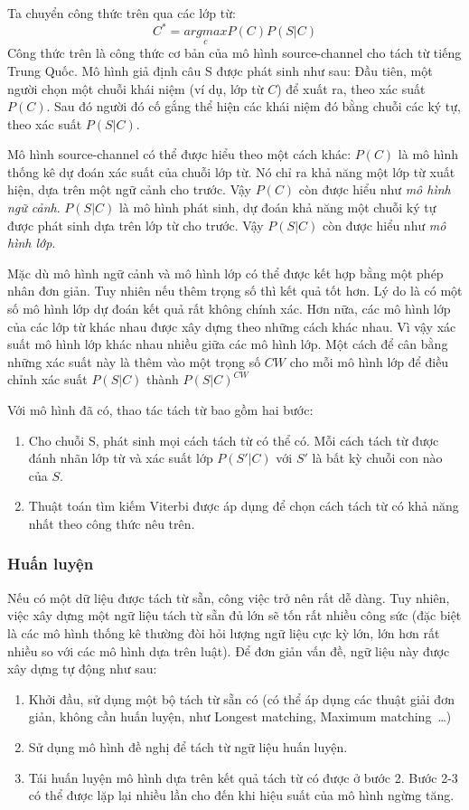\documentclass[a4paper,oneside,14pt]{extbook} %
\begin{document}
Ta chuyển công thức trên qua các lớp từ:
$$C^*=\underset{c}{argmax}P(C)P(S|C)$$
Công thức trên là công thức cơ bản của mô hình source-channel cho tách
từ tiếng Trung Quốc. Mô hình giả định câu S được phát sinh như sau:
Đầu tiên, một người chọn một chuỗi khái niệm (ví dụ, lớp từ $C$) để
xuất ra, theo xác suất $P(C)$. Sau đó người đó cố gắng thể hiện các
khái niệm đó bằng chuỗi các ký tự, theo xác suất $P(S|C)$.

Mô hình source-channel có thể được hiểu theo một cách khác: $P(C)$ là
mô hình thống kê dự đoán xác suất của chuỗi lớp từ. Nó chỉ ra khả năng
một lớp từ xuất hiện, dựa trên một ngữ cảnh cho trước. Vậy $P(C)$ còn
được hiểu như {\em mô hình ngữ cảnh}. $P(S|C)$ là mô hình phát sinh,
dự đoán khả năng một chuỗi ký tự được phát sinh dựa trên lớp từ cho
trước. Vậy $P(S|C)$ còn được hiểu như {\em mô hình lớp}.

Mặc dù mô hình ngữ cảnh và mô hình lớp có thể được kết hợp bằng một
phép nhân đơn giản. Tuy nhiên nếu thêm trọng số thì kết quả tốt
hơn. Lý do là có một số mô hình lớp dự đoán kết quả rất không chính
xác. Hơn nữa, các mô hình lớp của các lớp từ khác nhau được xây dựng
theo những cách khác nhau. Vì vậy xác suất mô hình lớp khác nhau nhiều
giữa các mô hình lớp. Một cách để cân bằng những xác suất này là thêm
vào một trọng số $CW$ cho mỗi mô hình lớp để điều chỉnh xác suất
$P(S|C)$ thành $P(S|C)^{CW}$

Với mô hình đã có, thao tác tách từ bao gồm hai bước:
\begin{enumerate}
\item Cho chuỗi S, phát sinh mọi cách tách từ có thể có. Mỗi cách tách
  từ được đánh nhãn lớp từ và xác suất lớp $P(S'|C)$ với $S'$ là bất
  kỳ chuỗi con nào của $S$.
\item Thuật toán tìm kiếm Viterbi được áp dụng để chọn cách tách từ có
  khả năng nhất theo công thức nêu trên.
\end{enumerate}

\subsubsection{Huấn luyện}

Nếu có một dữ liệu được tách từ sẵn, công việc trở nên rất dễ
dàng. Tuy nhiên, việc xây dựng một ngữ liệu tách từ sẵn đủ lớn sẽ tốn
rất nhiều công sức (đặc biệt là các mô hình thống kê thường đòi hỏi
lượng ngữ liệu cực kỳ lớn, lớn hơn rất nhiều so với các mô hình dựa
trên luật). Để đơn giản vấn đề, ngữ liệu này được xây dựng tự động như
sau:
\begin{enumerate}
\item Khởi đầu, sử dụng một bộ tách từ sẵn có (có thể áp dụng các
  thuật giải đơn giản, không cần huấn luyện, như Longest matching,
  Maximum matching~\ldots{})
\item Sử dụng mô hình đề nghị để tách từ ngữ liệu huấn luyện.
\item Tái huấn luyện mô hình dựa trên kết quả tách từ có được ở bước
  2. Bước 2-3 có thể được lặp lại nhiều lần  cho đến khi hiệu suất của
  mô hình ngừng tăng.
\end{enumerate}
\end{document}
